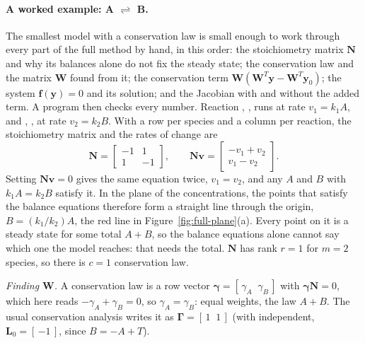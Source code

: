 \documentclass[11pt,a4paper,openany]{report}
\begin{document}
{{\paragraph{A worked example: A $\rightleftharpoons$ B.} The smallest model
with a conservation law is small enough to work through every part of the
full method by hand, in this order: the stoichiometry matrix $\mathbf{N}$
and why its balances alone do not fix the steady state; the conservation
law and the matrix $\mathbf{W}$ found from it; the conservation term
$\mathbf{W}(\mathbf{W}^T \mathbf{y} - \mathbf{W}^T \mathbf{y}_0)$; the
system $\mathbf{f}(\mathbf{y}) = 0$ and its solution; and the Jacobian with
and without the added term. A program then checks every number.
Reaction , ,
runs at rate $v_1 = k_1 A$, and , , at rate $v_2 = k_2
B$. With a row per species and a column per reaction, the stoichiometry
matrix and the rates of change are
\[
  \mathbf{N} = \begin{bmatrix} -1 & 1 \\ 1 & -1 \end{bmatrix} ,
  \qquad
  \mathbf{N} \mathbf{v} = \begin{bmatrix} -v_1 + v_2 \\ v_1 - v_2 \end{bmatrix} .
\]
Setting $\mathbf{N} \mathbf{v} = 0$ gives the same equation twice, $v_1 = v_2$, and
any $A$ and $B$ with $k_1 A = k_2 B$ satisfy it. In the plane of the
concentrations, the points that satisfy the balance equations therefore
form a straight line through the origin, $B = (k_1 / k_2) A$, the red line
in Figure~\ref{fig:full-plane}(a). Every point on it is a steady state for
some total $A + B$, so the balance equations alone cannot say which one the
model reaches: that needs the total. $\mathbf{N}$ has rank $r = 1$ for $m = 2$
species, so there is $c = 1$ conservation law.

\emph{Finding $\mathbf{W}$.} A conservation law is a row vector $\boldsymbol{\gamma} =
[\,\gamma_A \;\; \gamma_B\,]$ with $\boldsymbol{\gamma} \mathbf{N} = 0$, which here reads
$-\gamma_A + \gamma_B = 0$, so $\gamma_A = \gamma_B$: equal weights, the law
$A + B$. The usual conservation
analysis writes it as $\mathbf{\Gamma} = [\,1 \;\; 1\,]$ (with 
independent, $\mathbf{L}_0 = [\,{-1}\,]$, since $B = -A + T$).

}}
\end{document}
